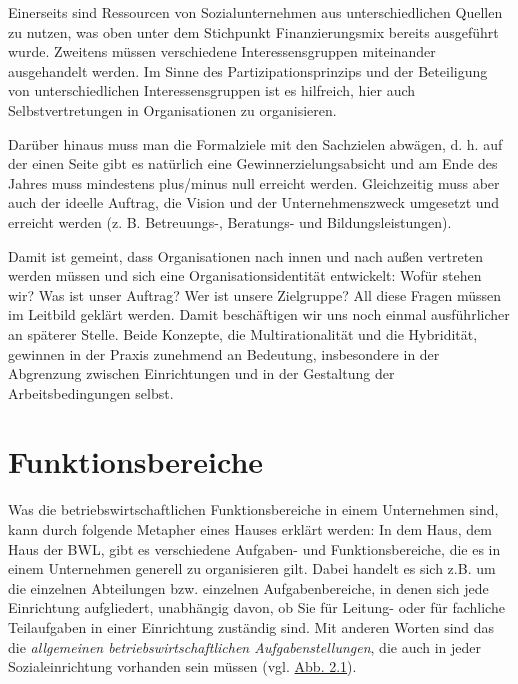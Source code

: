 \documentclass[
  letterpaper,
]{book}
\begin{document}
Einerseits sind Ressourcen von Sozialunternehmen aus unterschiedlichen
Quellen zu nutzen, was oben unter dem Stichpunkt Finanzierungsmix
bereits ausgeführt wurde. Zweitens müssen verschiedene
Interessensgruppen miteinander ausgehandelt werden. Im Sinne des
Partizipationsprinzips und der Beteiligung von unterschiedlichen
Interessensgruppen ist es hilfreich, hier auch Selbstvertretungen in
Organisationen zu organisieren.

Darüber hinaus muss man die Formalziele mit den Sachzielen abwägen, d.
h. auf der einen Seite gibt es natürlich eine Gewinnerzielungsabsicht
und am Ende des Jahres muss mindestens plus/minus null erreicht werden.
Gleichzeitig muss aber auch der ideelle Auftrag, die Vision und der
Unternehmenszweck umgesetzt und erreicht werden (z. B. Betreuungs-,
Beratungs- und Bildungsleistungen).

Damit ist gemeint, dass Organisationen nach innen und nach außen
vertreten werden müssen und sich eine Organisationsidentität entwickelt:
Wofür stehen wir? Was ist unser Auftrag? Wer ist unsere Zielgruppe? All
diese Fragen müssen im Leitbild geklärt werden. Damit beschäftigen wir
uns noch einmal ausführlicher an späterer Stelle. Beide Konzepte, die
Multirationalität und die Hybridität, gewinnen in der Praxis zunehmend
an Bedeutung, insbesondere in der Abgrenzung zwischen Einrichtungen und
in der Gestaltung der Arbeitsbedingungen selbst.

\chapter{Funktionsbereiche}\label{funktionsbereiche}

Was die betriebswirtschaftlichen Funktionsbereiche in einem Unternehmen
sind, kann durch folgende Metapher eines Hauses erklärt werden: In dem
Haus, dem Haus der BWL, gibt es verschiedene Aufgaben- und
Funktionsbereiche, die es in einem Unternehmen generell zu organisieren
gilt. Dabei handelt es sich z.B. um die einzelnen Abteilungen bzw.
einzelnen Aufgabenbereiche, in denen sich jede Einrichtung aufgliedert,
unabhängig davon, ob Sie für Leitung- oder für fachliche Teilaufgaben in
einer Einrichtung zuständig sind. Mit anderen Worten sind das die
\emph{allgemeinen betriebswirtschaftlichen Aufgabenstellungen}, die auch
in jeder Sozialeinrichtung vorhanden sein müssen (vgl.
\hyperref[figure21]{Abb. 2.1}).
\end{document}
